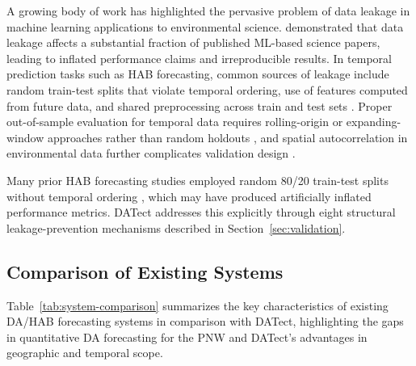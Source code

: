 \documentclass[preprint,12pt,authoryear]{elsarticle}
\begin{document}
A growing body of work has highlighted the pervasive problem of data leakage in machine learning applications to environmental science. \citet{Kapoor2023} demonstrated that data leakage affects a substantial fraction of published ML-based science papers, leading to inflated performance claims and irreproducible results. In temporal prediction tasks such as HAB forecasting, common sources of leakage include random train-test splits that violate temporal ordering, use of features computed from future data, and shared preprocessing across train and test sets \citep{Kaufman2012, Roberts2017, Bergmeir2012}. Proper out-of-sample evaluation for temporal data requires rolling-origin or expanding-window approaches rather than random holdouts \citep{Tashman2000}, and spatial autocorrelation in environmental data further complicates validation design \citep{Valavi2019}.

Many prior HAB forecasting studies employed random 80/20 train-test splits without temporal ordering \citep{Cruz2021, Shin2024}, which may have produced artificially inflated performance metrics. DATect addresses this explicitly through eight structural leakage-prevention mechanisms described in Section~\ref{sec:validation}.

\subsection{Comparison of Existing Systems}
\label{sec:rw-comparison}

Table~\ref{tab:system-comparison} summarizes the key characteristics of existing DA/HAB forecasting systems in comparison with DATect, highlighting the gaps in quantitative DA forecasting for the PNW and DATect's advantages in geographic and temporal scope.
\end{document}

